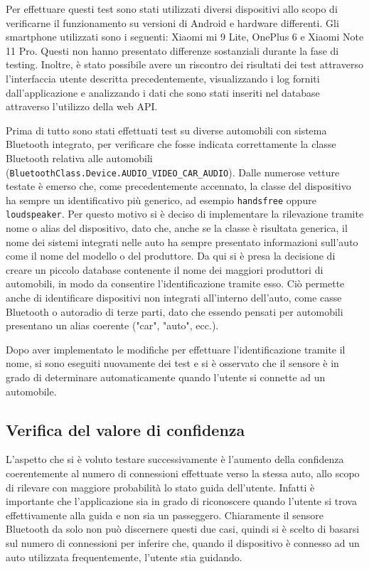 Per effettuare questi test sono stati utilizzati diversi dispositivi allo scopo di verificarne il funzionamento su versioni di Android e hardware differenti. Gli smartphone utilizzati sono i seguenti: Xiaomi mi 9 Lite, OnePlus 6 e Xiaomi Note 11 Pro. Questi non hanno presentato differenze sostanziali durante la fase di testing. Inoltre, è stato possibile avere un riscontro dei risultati dei test attraverso l'interfaccia utente descritta precedentemente, visualizzando i log forniti dall'applicazione e analizzando i dati che sono stati inseriti nel database attraverso l'utilizzo della web API.

Prima di tutto sono stati effettuati test su diverse automobili con sistema Bluetooth integrato, per verificare che fosse indicata correttamente la classe Bluetooth relativa alle automobili (\texttt{BluetoothClass.Device.AUDIO\_VIDEO\_CAR\_AUDIO}). Dalle numerose vetture testate è emerso che, come precedentemente accennato, la classe del dispositivo ha sempre un identificativo più generico, ad esempio \texttt{handsfree} oppure \texttt{loudspeaker}. Per questo motivo si è deciso di implementare la rilevazione tramite nome o alias del dispositivo, dato che, anche se la classe è risultata generica, il nome dei sistemi integrati nelle auto ha sempre presentato informazioni sull'auto come il nome del modello o del produttore. Da qui si è presa la decisione di creare un piccolo database contenente il nome dei maggiori produttori di automobili, in modo da consentire l'identificazione tramite esso. Ciò permette anche di identificare dispositivi non integrati all'interno dell'auto, come casse Bluetooth o autoradio di terze parti, dato che essendo pensati per automobili presentano un alias coerente ("car", "auto", ecc.).

Dopo aver implementato le modifiche per effettuare l'identificazione tramite il nome, si sono eseguiti nuovamente dei test e si è osservato che il sensore è in grado di determinare automaticamente quando l'utente si connette ad un automobile.

\subsection{Verifica del valore di confidenza}
L'aspetto che si è voluto testare successivamente è l'aumento della confidenza coerentemente al numero di connessioni effettuate verso la stessa auto, allo scopo di rilevare con maggiore probabilità lo stato guida dell'utente. Infatti è importante che l'applicazione sia in grado di riconoscere quando l'utente si trova effettivamente alla guida e non sia un passeggero. Chiaramente il sensore Bluetooth da solo non può discernere questi due casi, quindi si è scelto di basarsi sul numero di connessioni  per inferire che, quando il dispositivo è connesso ad un auto utilizzata frequentemente, l'utente stia guidando.

